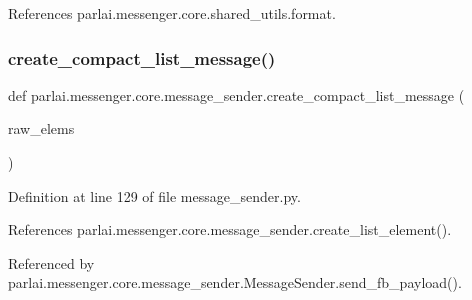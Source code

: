 References parlai.\+messenger.\+core.\+shared\+\_\+utils.\+format.

\mbox{\label{namespaceparlai_1_1messenger_1_1core_1_1message__sender_a4359c421913c537e0003032b1d1b79b5}} 
\subsubsection{\texorpdfstring{create\+\_\+compact\+\_\+list\+\_\+message()}{create\_compact\_list\_message()}}
{\footnotesize\ttfamily def parlai.\+messenger.\+core.\+message\+\_\+sender.\+create\+\_\+compact\+\_\+list\+\_\+message (\begin{DoxyParamCaption}\item[{}]{raw\+\_\+elems }\end{DoxyParamCaption})}



Definition at line 129 of file message\+\_\+sender.\+py.



References parlai.\+messenger.\+core.\+message\+\_\+sender.\+create\+\_\+list\+\_\+element().



Referenced by parlai.\+messenger.\+core.\+message\+\_\+sender.\+Message\+Sender.\+send\+\_\+fb\+\_\+payload().

